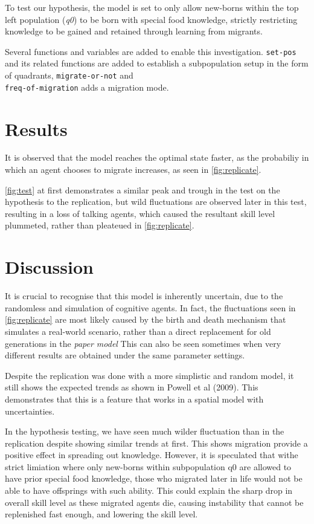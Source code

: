 \documentclass[a4paper,12pt]{article}
\begin{document}
To test our hypothesis, the model is set to only allow new-borns within the top left population (\textit{q0}) to be born with special food knowledge, strictly restricting knowledge to be gained and retained through learning from migrants.

Several functions and variables are added to enable this investigation. \texttt{set-pos} and its related functions are added to establish a subpopulation setup in the form of quadrants, \texttt{migrate-or-not} and \\ \texttt{freq-of-migration} adds a migration mode.

\section{Results}
It is observed that the model reaches the optimal state faster, as the probabiliy in which an agent chooses to migrate increases, as seen in \autoref{fig:replicate}. 

\autoref{fig:test} at first demonstrates a similar peak and trough in the test on the hypothesis to the replication, but wild fluctuations are observed later in this test, resulting in a loss of talking agents, which caused the resultant skill level plummeted, rather than pleateued in \autoref{fig:replicate}.


\section{Discussion}
It is crucial to recognise that this model is inherently uncertain, due to the randomless and simulation of cognitive agents. In fact, the fluctuations seen in \autoref{fig:replicate} are most likely caused by the birth and death mechanism that simulates a real-world scenario, rather than a direct replacement for old generations in the \textit{paper model} This can also be seen sometimes when very different results are obtained under the same parameter settings.

Despite the replication was done with a more simplistic and random model, it still shows the expected trends as shown in Powell et al (2009). This demonstrates that this is a feature that works in a spatial model with uncertainties.

In the hypothesis testing, we have seen much wilder fluctuation than in the replication despite showing similar trends at first. This shows migration provide a positive effect in spreading out knowledge. However, it is speculated that withe strict limiation where only new-borns within subpopulation q0 are allowed to have prior special food knowledge, those who migrated later in life would not be able to have offsprings with such ability. This could explain the sharp drop in overall skill level as these migrated agents die, causing instability that cannot be replenished fast enough, and lowering the skill level.
\end{document}

